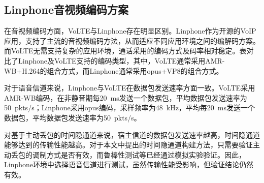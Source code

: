 \subsection{Linphone音视频编码方案}
\label{chap:linphone:motivation:coding}


在音视频编码方面，VoLTE与Linphone存在明显区别。Linphone作为开源的VoIP应用，支持了主流的音视频编码方法，从而适应不同应用环境之间的编解码方案。而VoLTE无需支持复杂的应用环境，通话采用的编码方式及码率相对稳定。表对比了Linphone及VoLTE支持的编码类型，其中，VoLTE通常采用AMR-WB+H.264的组合方式，而Linphone通常采用opus+VP8的组合方式。

对于语音信道来说，Linphone与VoLTE在数据包发送速率方面一致。VoLTE采用AMR-WB编码，在非静音期每{20\ ms}发送一个数据包，平均数据包发送速率为{50\ pkts/s}；Linphone采用opus编码，采样频率为{48\ kHz}，平均每{20\ ms}发送一个数据包，平均数据包发送速率为{50\ pkts/s}。

对基于主动丢包的时间隐通道来说，宿主信道的数据包发送速率越高，时间隐通道能够达到的传输性能越高。对于本文中提出的时间隐通道构建方法，只需要验证主动丢包的调制方式是否有效，而鲁棒性测试等已经通过模拟实验验证。因此，Linphone环境中选择语音信道进行测试，虽然传输性能受影响，但验证结论仍然有效。


